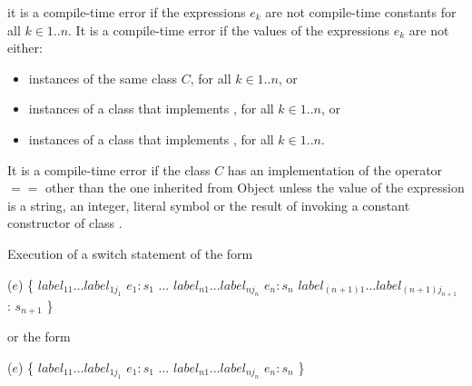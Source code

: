 \documentclass{article}
\newcommand{\code}[1]{{\sf #1}}
\begin{document}
 it is a compile-time error if the expressions $e_k$ are not compile-time constants for all  $k \in 1..n$.  It is a compile-time error if the values of the expressions $e_k$ are not either:
 \begin{itemize}
 \item instances of the same class $C$, for all $k \in 1..n$,  or
 \item instances of a class that implements , for all $k \in 1..n$,  or
 \item instances of a class that implements , for all $k \in 1..n$.
 \end{itemize}


\LMHash{}
It is a compile-time error if the class $C$ has an implementation of the operator $==$ other than the one inherited from \code{Object} unless the value of the expression is a string, an integer, literal symbol or the result of invoking a constant constructor of class .



\LMHash{}
Execution of a switch statement of the form

\begin{dartCode}
\SWITCH{} ($e$) \{
   $label_{11} \ldots label_{1j_1}$ \CASE{} $e_1: s_1$
   $\ldots$
   $label_{n1} \ldots label_{nj_n}$ \CASE{} $e_n: s_n$
   $label_{(n+1)1} \ldots label_{(n+1)j_{n+1}}$ \DEFAULT{}: $s_{n+1}$
\}
\end{dartCode}

or the form

\begin{dartCode}
\SWITCH{} ($e$) \{
   $label_{11} \ldots label_{1j_1}$ \CASE{} $e_1: s_1$
   $\ldots$
   $label_{n1} \ldots label_{nj_n}$ \CASE{} $e_n: s_n$
\}
\end{dartCode}
\end{document}
